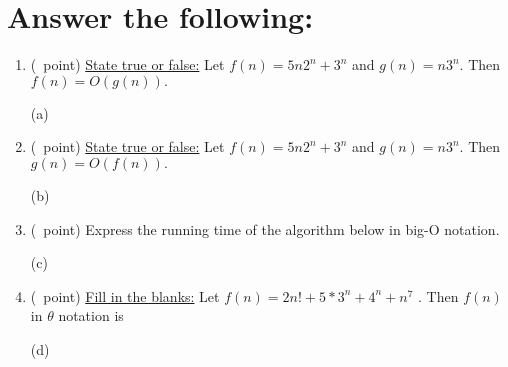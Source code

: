 \documentclass[14pt]{article}
\begin{document}
\section{Answer the following:}
\begin{enumerate}[label=\alph*)]
    \item (\textonequarter\ point) \underline{State true or false:} Let $f(n) = 5n2^{n} + 3^{n}$ and $g(n) = n3^{n}.$ Then $f(n) = O(g(n)).$ \\ \vspace{1em}
    \begin{flushright}
    (a) \underline{\hspace{5cm}}
    \end{flushright}
    
    \item (\textonequarter\ point) \underline{State true or false:} Let $f(n) = 5n2^{n} + 3^{n}$ and $g(n) = n3^{n}.$ Then $g(n) = O(f(n)).$ \\ \vspace{1em}
    \begin{flushright}
    (b) \underline{\hspace{5cm}}
    \end{flushright}
    
    \item (\textonequarter\ point) Express the running time of the algorithm below in big-O notation. \\
    \begin{flushright}
    (c) \underline{\hspace{6cm}}
    \end{flushright}
    
    \item (\textonequarter\ point) \underline{Fill in the blanks:} Let $f(n) = 2n!+5*3^{n} + 4^{n} + n^7$ . Then $f(n)$ in $\theta$ notation is \\ \vspace{1em}
    \begin{flushright}
    (d) \underline{\hspace{5cm}}
    \end{flushright}
\end{enumerate}
\end{document}
